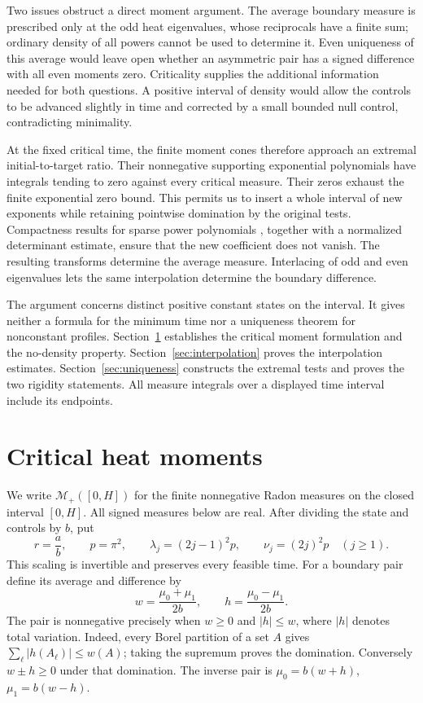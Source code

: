 \documentclass[11pt]{article}
\theoremstyle{remark}
\newcommand{\Mplus}{\mathcal M_+}
\begin{document}
Two issues obstruct a direct moment argument. The average boundary measure
is prescribed only at the odd heat eigenvalues, whose reciprocals have a
finite sum; ordinary density of all powers cannot be used to determine it.
Even uniqueness of this average would leave open whether an asymmetric pair
has a signed difference with all even moments zero. Criticality supplies the
additional information needed for both questions. A positive interval of
density would allow the controls to be advanced slightly in time and corrected
by a small bounded null control, contradicting minimality.

At the fixed critical time, the finite moment cones therefore approach an
extremal initial-to-target ratio. Their nonnegative supporting exponential
polynomials have integrals tending to zero against every critical measure.
Their zeros exhaust the finite exponential zero bound. This permits us to
insert a whole interval of new exponents while retaining pointwise domination
by the original tests. Compactness results for sparse power polynomials
\cite{BE1997}, together with a normalized determinant estimate, ensure that
the new coefficient does not vanish. The resulting transforms determine the
average measure. Interlacing of odd and even eigenvalues lets the same
interpolation determine the boundary difference.

The argument concerns distinct positive constant states on the interval.
It gives neither a formula for the minimum time nor a uniqueness theorem for
nonconstant profiles. Section~\ref{sec:critical} establishes the critical
moment formulation and the no-density property. Section~\ref{sec:interpolation}
proves the interpolation estimates. Section~\ref{sec:uniqueness} constructs
the extremal tests and proves the two rigidity statements. All measure
integrals over a displayed time interval include its endpoints.

\section{Critical heat moments}\label{sec:critical}

We write $\Mplus([0,H])$ for the finite nonnegative Radon measures on the
closed interval $[0,H]$. All signed measures below are real. After dividing
the state and controls by $b$, put
\begin{equation}\label{eq:rates}
 r=\frac ab,\qquad p=\pi^2,\qquad
 \lambda_j=(2j-1)^2p,\qquad \nu_j=(2j)^2p\quad(j\ge1).
\end{equation}
This scaling is invertible and preserves every feasible time. For a boundary
pair define its average and difference by
\begin{equation}\label{eq:parity}
 w=\frac{\mu_0+\mu_1}{2b},\qquad h=\frac{\mu_0-\mu_1}{2b}.
\end{equation}
The pair is nonnegative precisely when $w\ge0$ and $|h|\le w$, where $|h|$
denotes total variation. Indeed, every Borel partition of a set $A$ gives
$\sum_\ell|h(A_\ell)|\le w(A)$; taking the supremum proves the domination.
Conversely $w\pm h\ge0$ under that domination. The inverse pair is
$\mu_0=b(w+h)$, $\mu_1=b(w-h)$.
\end{document}
